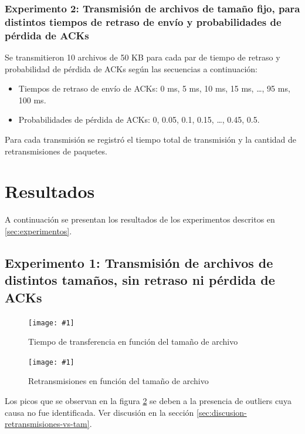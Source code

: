 \documentclass[a4paper, 10pt, twoside]{article}
\newcommand{\grafico}[3]{
  \begin{figure}[H]
    \texttt{[image: \#1]}
    \caption{#2}
    \label{#3}
  \end{figure}
}
\begin{document}
\subsubsection{Experimento 2: Transmisión de archivos de tamaño fijo, para distintos tiempos de retraso de envío y probabilidades de pérdida de ACKs}

Se transmitieron 10 archivos de 50 KB para cada par de tiempo de retraso y probabilidad de pérdida de ACKs según las secuencias a continuación:

\begin{itemize}
  \item Tiempos de retraso de envío de ACKs:  0 ms, 5 ms, 10 ms, 15 ms, \ldots, 95 ms, 100 ms.
  \item Probabilidades de pérdida de ACKs: 0, 0.05, 0.1, 0.15, \ldots, 0.45, 0.5.
\end{itemize}

Para cada transmisión se registró el tiempo total de transmisión y la cantidad de retransmisiones de paquetes.




\section{Resultados}
\label{sec:resultados}

A continuación se presentan los resultados de los experimentos descritos en \ref{sec:experimentos}.


\subsection{Experimento 1: Transmisión de archivos de distintos tamaños, sin retraso ni pérdida de ACKs}
\label{sec:experimento-distintos-tamanos-de-archivo}

\grafico{time_vs_size}
        {Tiempo de transferencia en función del tamaño de archivo}
        {plot:time_vs_size}

\grafico{retransmissions_vs_size}
        {Retransmisiones en función del tamaño de archivo}
        {plot:retransmissions_vs_size}

Los picos que se observan en la figura \ref{plot:retransmissions_vs_size} se deben a la presencia de outliers cuya causa no fue identificada. Ver discusión en la sección \ref{sec:discusion-retransmisiones-vs-tam}.
\end{document}
